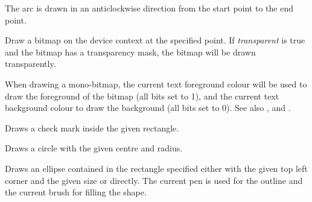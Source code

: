 The arc is drawn in an anticlockwise direction from the start point to the end point.


\label{wxdcdrawbitmap}


Draw a bitmap on the device context at the specified point. If {\it transparent} is true and the bitmap has
a transparency mask, the bitmap will be drawn transparently.

When drawing a mono-bitmap, the current text foreground colour will be used to draw the foreground
of the bitmap (all bits set to 1), and the current text background colour to draw the background
(all bits set to 0). See also , 
 and .


\label{wxdcdrawcheckmark}



Draws a check mark inside the given rectangle.


\label{wxdcdrawcircle}



Draws a circle with the given centre and radius.




\label{wxdcdrawellipse}




Draws an ellipse contained in the rectangle specified either with the given top
left corner and the given size or directly. The current pen is used for the
outline and the current brush for filling the shape.

